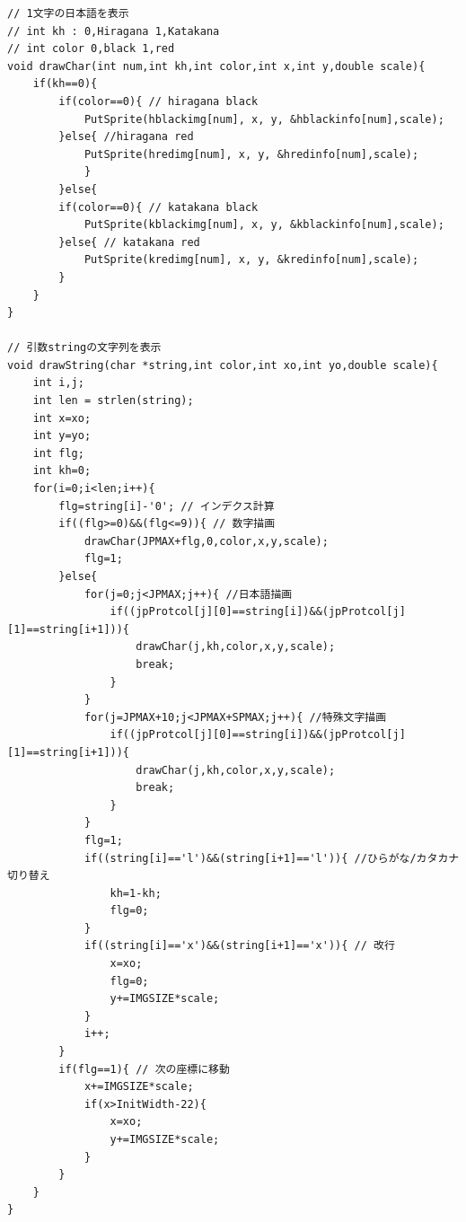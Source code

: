 \documentclass[a4j]{jarticle}
\begin{document}
    \begin{lstlisting}[basicstyle=\ttfamily\footnotesize, frame=single,label=jpfunc,caption=日本語表示のための関数]
// 1文字の日本語を表示
// int kh : 0,Hiragana 1,Katakana
// int color 0,black 1,red
void drawChar(int num,int kh,int color,int x,int y,double scale){
    if(kh==0){
        if(color==0){ // hiragana black
            PutSprite(hblackimg[num], x, y, &hblackinfo[num],scale);
        }else{ //hiragana red
            PutSprite(hredimg[num], x, y, &hredinfo[num],scale);
            }
        }else{ 
        if(color==0){ // katakana black
            PutSprite(kblackimg[num], x, y, &kblackinfo[num],scale);
        }else{ // katakana red
            PutSprite(kredimg[num], x, y, &kredinfo[num],scale);
        }
    }
}

// 引数stringの文字列を表示
void drawString(char *string,int color,int xo,int yo,double scale){
    int i,j;
    int len = strlen(string);
    int x=xo;
    int y=yo;
    int flg;
    int kh=0;
    for(i=0;i<len;i++){
        flg=string[i]-'0'; // インデクス計算
        if((flg>=0)&&(flg<=9)){ // 数字描画
            drawChar(JPMAX+flg,0,color,x,y,scale);
            flg=1;
        }else{
            for(j=0;j<JPMAX;j++){ //日本語描画
                if((jpProtcol[j][0]==string[i])&&(jpProtcol[j][1]==string[i+1])){
                    drawChar(j,kh,color,x,y,scale);
                    break;
                }
            }       
            for(j=JPMAX+10;j<JPMAX+SPMAX;j++){ //特殊文字描画
                if((jpProtcol[j][0]==string[i])&&(jpProtcol[j][1]==string[i+1])){
                    drawChar(j,kh,color,x,y,scale);
                    break;
                }
            }
            flg=1;
            if((string[i]=='l')&&(string[i+1]=='l')){ //ひらがな/カタカナ切り替え
                kh=1-kh;
                flg=0;
            }
            if((string[i]=='x')&&(string[i+1]=='x')){ // 改行
                x=xo;
                flg=0;
                y+=IMGSIZE*scale;
            }     
            i++;
        }
        if(flg==1){ // 次の座標に移動
            x+=IMGSIZE*scale;
            if(x>InitWidth-22){
                x=xo;
                y+=IMGSIZE*scale;
            }
        }
    }
}

                  \end{lstlisting} 
\end{document}

